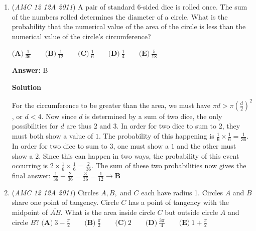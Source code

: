 \begin{enumerate}
 $\textbf{(A)}\ 324 \qquad \textbf{(B)}\ 441 \qquad \textbf{(C)}\ 630 \qquad \textbf{(D)}\ 648 \qquad \textbf{(E)}\ 882$

 \textbf{Answer: }B



\textbf{Solution}

There are $18$ total twins and $18$ total triplets. Each of the twins shakes hands with the $16$ twins not in their family and $9$ of the triplets, a total of $25$ people. Each of the triplets shakes hands with the $15$ triplets not in their family and $9$ of the twins, for a total of $24$ people. Dividing by two to accommodate the fact that each handshake was counted twice, we get a total of $\frac{1}{2}\times 18 \times (25+24) = 9 \times 49 = 441 \rightarrow \boxed{\textbf{B}}$



	\item (\textit{AMC 12 12A 2011}) A pair of standard $6$-sided dice is rolled once. The sum of the numbers rolled determines the diameter of a circle. What is the probability that the numerical value of the area of the circle is less than the numerical value of the circle's circumference?


 $\textbf{(A)}\ \frac{1}{36} \qquad \textbf{(B)}\ \frac{1}{12} \qquad \textbf{(C)}\ \frac{1}{6} \qquad \textbf{(D)}\ \frac{1}{4} \qquad \textbf{(E)}\ \frac{5}{18}$

 \textbf{Answer: }B



\textbf{Solution}

For the circumference to be greater than the area, we must have $\pi d > \pi \left( \frac{d}{2} \right) ^2$, or $d<4$. Now since $d$ is determined by a sum of two dice, the only possibilities for $d$ are thus $2$ and $3$. In order for two dice to sum to $2$, they must both show a value of $1$. The probability of this happening is $\frac{1}{6} \times \frac{1}{6} = \frac{1}{36}$. In order for two dice to sum to $3$, one must show a $1$ and the other must show a $2$. Since this can happen in two ways, the probability of this event occurring is $2 \times \frac{1}{6} \times \frac{1}{6} = \frac{2}{36}$. The sum of these two probabilities now gives the final answer: $\frac{1}{36} + \frac{2}{36} = \frac{3}{36} = \frac{1}{12} \rightarrow \boxed{\textbf{B}}$



	\item (\textit{AMC 12 12A 2011}) Circles $A, B,$ and $C$ each have radius 1. Circles $A$ and $B$ share one point of tangency. Circle $C$ has a point of tangency with the midpoint of $\overline{AB}.$ What is the area inside circle $C$ but outside circle $A$ and circle $B?$
$\textbf{(A)}\ 3 - \frac{\pi}{2} \qquad \textbf{(B)}\ \frac{\pi}{2} \qquad \textbf{(C)}\  2 \qquad \textbf{(D)}\ \frac{3\pi}{4} \qquad \textbf{(E)}\ 1+\frac{\pi}{2}$


\end{enumerate}
